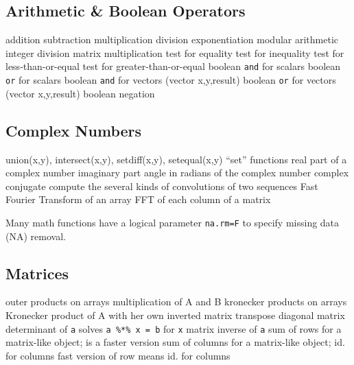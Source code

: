 \subsection{Arithmetic \& Boolean Operators}{}
	{addition}
	{subtraction}
	{multiplication}
	{division}
	{exponentiation}
	{modular arithmetic}
	{integer division}
	{matrix multiplication}
	{test for equality}
	{test for inequality}
	{test for less-than-or-equal}
	{test for greater-than-or-equal}
	{boolean {\tt and} for scalars}
	{boolean {\tt or} for scalars}
	{boolean {\tt and} for vectors (vector x,y,result)}
	{boolean {\tt or} for vectors\\(vector x,y,result)}
	{boolean negation}

\subsection{Complex Numbers}{{\smalltt union(x,y),  intersect(x,y),  setdiff(x,y),  setequal(x,y)}}
	{``set'' functions}
	{real part of a complex number}
	{imaginary part}
	{angle in radians of the complex number}
	{complex conjugate}
	{compute the several kinds of convolutions of two sequences}
	{Fast Fourier Transform of an array}
	{FFT of each column of a matrix}

Many math functions have a logical parameter {\tt na.rm=F} to
specify missing data (NA) removal.

\subsection{Matrices}{}
	{outer products on arrays}
	{multiplication of A and B}
	{kronecker products on arrays}
	{Kronecker product of A with her own inverted matrix}
	{transpose}
	{diagonal}
	{matrix determinant of {\tt a}}
	{solves {\tt a \%*\% x = b} for {\tt x}}
	{matrix inverse of {\tt a}}
	{sum of rows for a matrix-like object;}
	{is a faster version}
	{sum of columns for a matrix-like object;}
	{id. for columns}
	{fast version of row means}
	{id. for columns}

